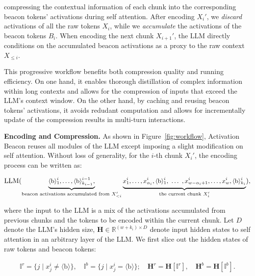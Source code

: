 compressing the contextual information of each chunk into the corresponding beacon tokens' activations during self attention. After encoding $X_i'$, we \textit{discard} activations of all the raw tokens $X_i$, while we \textit{accumulate} the activations of the beacon tokens $B_i$. When encoding the next chunk $X_{i+1}'$, the LLM directly conditions on the accumulated beacon activations as a proxy to the raw context $X_{\le i}$.

This progressive workflow benefits both compression quality and running efficiency. On one hand, it enables thorough distillation of complex information within long contexts and allows for the compression of inputs that exceed the LLM’s context window. On the other hand, by caching and reusing beacon tokens' activations, it avoids redudant computation and allows for incrementally update of the compression results in multi-turn interactions.

\textbf{Encoding and Compression.} As shown in Figure~\ref{fig:workflow}, Activation Beacon reuses all modules of the LLM except imposing a slight modification on self attention. Without loss of generality, for the $i$-th chunk $X_i'$, the encoding process can be written as:

\begin{equation}
\small
    \mathrm{LLM}
    ( 
    \underbrace{\langle\text{b}\rangle_1^i,\dots,\langle\text{b}\rangle^{i-1}_{k_{i-1}},}_{\text{beacon activations accumulated from }X'_{<i}}
    \underbrace{x^i_1,\dots,x^i_{\alpha_i},\langle\text{b}\rangle^i_1,~\dots~,x^i_{w-\alpha_i+1},\dots,x^i_w,\langle\text{b}\rangle^i_{k_i}\vphantom{\langle\text{b}\rangle^{i-1}_{k_{i-1}}}}_{\text{the current chunk }X'_i}
    ),
\end{equation}

where the input to the LLM is a mix of the activations accumulated from previous chunks and the tokens to be encoded within the current chunk. Let $D$ denote the LLM's hidden size, $\boldsymbol{H}\in\mathbb{R}^{(w+k_i)\times D}$ denote input hidden states to self attention in an arbitrary layer of the LLM. We first slice out the hidden states of raw tokens and beacon tokens:

\begin{gather}
    \mathbb{I}^r=\{j\mid x^i_j \ne \langle\text{b}\rangle\},\quad\mathbb{I}^b=\{j\mid x^i_j = \langle\text{b}\rangle\};\quad
    \boldsymbol{H}^r=\boldsymbol{H}[\mathbb{I}^r],\quad\boldsymbol{H}^b=\boldsymbol{H}[\mathbb{I}^b].
\end{gather}

